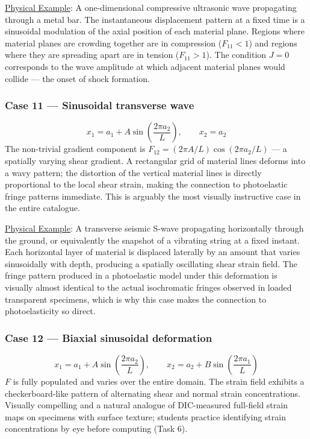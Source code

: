 \documentclass[11pt]{article}
\begin{document}
\uline{Physical Example}: A one-dimensional compressive ultrasonic wave propagating through a metal bar. The instantaneous displacement pattern at a fixed time is a sinusoidal modulation of the axial position of each material plane. Regions where material planes are crowding together are in compression (\(F_{11}<1\)) and regions where they are spreading apart are in tension (\(F_{11}>1\)). The condition \(J=0\) corresponds to the wave amplitude at which adjacent material planes would collide — the onset of shock formation.
\subsubsection*{Case 11 — Sinusoidal transverse wave}
\label{sec:org710cdbb}
\[
  x_1 = a_1 + A\sin\!\left(\frac{2\pi a_2}{L}\right), \qquad
  x_2 = a_2
\]
The non-trivial gradient component is \(F_{12} = (2\pi A/L)\cos(2\pi
a_2/L)\) — a spatially varying shear gradient.  A rectangular grid of
material lines deforms into a wavy pattern; the distortion of the
vertical material lines is directly proportional to the local shear
strain, making the connection to photoelastic fringe patterns
immediate.  This is arguably the most visually instructive case in the
entire catalogue.

\uline{Physical Example}: A transverse seismic S-wave propagating horizontally through the ground, or equivalently the snapshot of a vibrating string at a fixed instant. Each horizontal layer of material is displaced laterally by an amount that varies sinusoidally with depth, producing a spatially oscillating shear strain field. The fringe pattern produced in a photoelastic model under this deformation is visually almost identical to the actual isochromatic fringes observed in loaded transparent specimens, which is why this case makes the connection to photoelasticity so direct.
\subsubsection*{Case 12 — Biaxial sinusoidal deformation}
\label{sec:org5e51624}
\[
  x_1 = a_1 + A\sin\!\left(\frac{2\pi a_2}{L}\right), \qquad
  x_2 = a_2 + B\sin\!\left(\frac{2\pi a_1}{L}\right)
\]
\(F\) is fully populated and varies over the entire domain.  The strain
field exhibits a checkerboard-like pattern of alternating shear and
normal strain concentrations.  Visually compelling and a natural
analogue of DIC-measured full-field strain maps on specimens with
surface texture; students practice identifying strain concentrations by
eye before computing (Task 6).
\end{document}
